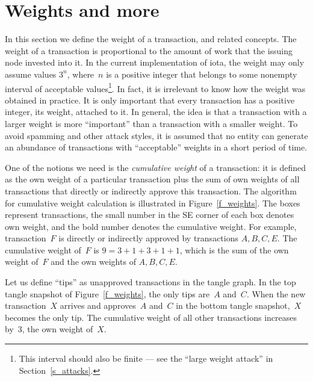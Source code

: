 \documentclass[12pt]{article}
\begin{document}
\section{Weights and more}
\label{s_weight_algo}
In this section we define the weight of a transaction, 
and related concepts. The weight of a transaction is 
proportional to the amount of work that the issuing node invested 
into it. In 
the current implementation of iota,
the weight may only assume values $3^n$, 
where~$n$ is a positive integer that belongs to 
some nonempty interval of acceptable values\footnote{This
interval should also be finite --- see the ``large weight 
attack'' in Section~\ref{s_attacks}.}.
In fact,
it is irrelevant to know how the weight
was obtained in practice. 
It is only important that every transaction
has a positive integer, its weight,
attached to it. 
 In general, the idea is that a transaction with a
 larger weight is more ``important'' than a transaction
 with a smaller weight.
 To avoid spamming and 
 other attack styles, it is assumed that
 no entity can generate
an abundance of transactions with ``acceptable'' weights
 in a short period of time.

One of the notions we need is the \emph{cumulative weight}
of a transaction:
it is defined as the own weight of a particular transaction plus
the sum of own weights of all transactions that directly or indirectly approve
this transaction.
The algorithm for cumulative weight calculation is illustrated in 
Figure~\ref{f_weights}. The boxes represent transactions,
the small number in the SE corner of each box denotes own weight, and the 
bold number denotes
the cumulative weight. For example, transaction~$F$
is directly or indirectly approved
by transactions
$A,B,C,E$. The cumulative weight of~$F$ is
$9=3+1+3+1+1$, which is the sum of the own weight of~$F$ and the 
own weights of $A,B,C,E$.

 Let us define ``tips'' as unapproved transactions 
 in the tangle graph.
 In the top 
 tangle snapshot of 
Figure~\ref{f_weights}, the only 
tips are~$A$ and~$C$.
When the new transaction~$X$ 
arrives and approves~$A$ and~$C$ in the bottom 
tangle snapshot,~$X$ becomes the only tip.
 The cumulative weight of all other transactions
increases by~$3$, the own weight of~$X$.
\end{document}
